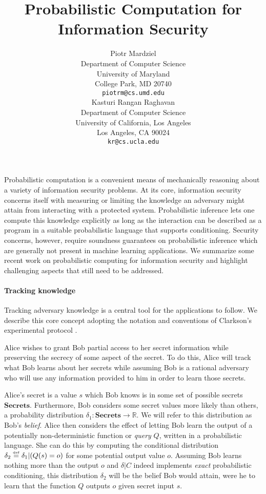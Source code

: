 \documentclass{article} %
\title{Probabilistic Computation for Information Security}
\author{
Piotr Mardziel\\
Department of Computer Science\\
University of Maryland\\
College Park, MD 20740 \\
\texttt{piotrm@cs.umd.edu} \\
\And
Kasturi Rangan Raghavan\\
Department of Computer Science\\
University of California, Los Angeles\\
Los Angeles, CA 90024\\
\texttt{kr@cs.ucla.edu} \\
}
\newcommand{\ra}{\rightarrow}
\newcommand{\Real}{\mathbb{R}}
\newcommand{\secrets}[0]{\textbf{Secrets}}
\newcommand{\cond}[0]{|}
\newcommand{\stacklabel}[1]{\stackrel{\smash{\scriptscriptstyle \mathrm{#1}}}}
\newcommand{\defeq}{\stacklabel{def}=}
\theoremstyle{plain} %
\theoremstyle{definition} %
\begin{document}
\maketitle

Probabilistic computation is a convenient means of mechanically
reasoning about a variety of information security problems. At its
core, information security concerns itself with measuring or limiting
the knowledge an adversary might attain from interacting with a
protected system. Probabilistic inference lets one compute this
knowledge explicitly as long as the interaction can be described as a
program in a suitable probabilistic language that supports
conditioning. Security concerns, however, require soundness guarantees
on probabilistic inference which are generally not present in machine
learning applications. We summarize some recent work on probabilistic
computing for information security and highlight challenging aspects
that still need to be addressed.

\paragraph*{Tracking knowledge}

Tracking adversary knowledge is a central tool for the applications to
follow. We describe this core concept adopting the notation and
conventions of Clarkson's experimental protocol
\cite{clarkson09quantifying}.

Alice wishes to grant Bob partial access to her secret information
while preserving the secrecy of some aspect of the secret. To do this,
Alice will track what Bob learns about her secrets while assuming Bob
is a rational adversary who will use any information provided to him
in order to learn those secrets.

Alice's secret is a value $ s $ which Bob knows is in some set of
possible secrets $ \secrets $. Furthermore, Bob considers some secret
values more likely than others, a probability distribution $ \delta_1
: \secrets \ra \Real $. We will refer to this distribution as Bob's
\emph{belief}. Alice then considers the effect of letting Bob learn
the output of a potentially non-deterministic function or \emph{query}
$ Q $, written in a probabilistic language. She can do this by
computing the conditional distribution $ \delta_2 \defeq \delta_1
\cond (Q(s) = o) $ for some potential output value $ o $. Assuming Bob
learns nothing more than the output $ o $ and $ \delta | C $ indeed
implements \emph{exact} probabilistic conditioning, this distribution
$ \delta_2 $ will be the belief Bob would attain, were he to learn
that the function $ Q $ outputs $ o $ given secret input $ s $.
\end{document}

